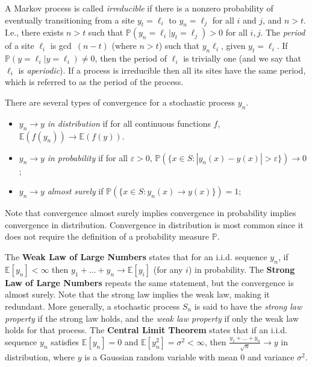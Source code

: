 \documentclass[12pt]{article}
\begin{document}
\begin{itemize}
A Markov process is called {\it irreducible} if there is a nonzero
probability of eventually transitioning from a site $y_t = \ell_i$ to
$y_n = \ell_j$ for all $i$ and $j$, and $n > t$.
I.e., there exists $n > t$ such that $\mathbb{P}(y_n=\ell_i | y_t=\ell_j)>0$
for all $i,j$.
The {\it period} of a site $\ell_i$ is gcd~$(n-t)$ (where $n>t$) such
that $y_n\ell_i$, given $y_t=\ell_i$.
If $\mathbb{P}(y=\ell_i | y=\ell_i) \neq 0$, then the period of $\ell_i$
is trivially one (and we say that $\ell_i$ is {\it aperiodic}).
If a process is irreducible then all its sites have the same period,
which is referred to as the period of the process.
\end{itemize}

There are several types of convergence for a stochastic process $y_n$.
\begin{itemize}
\item $y_n \rightarrow y$ {\it in distribution} if for all continuous
functions $f$, $\mathbb{E}(f(y_n)) \rightarrow \mathbb{E}(f(y))$.
\item $y_n \rightarrow y$ {\it in probability} if for all $\varepsilon>0$,
$\mathbb{P}(\{x\in S : |y_n(x) - y(x)|>\varepsilon\})\rightarrow 0$;
\item $y_n \rightarrow y$ {\it almost surely} if
$\mathbb{P}(\{x\in S : y_n(x) \rightarrow y(x)\}) = 1$;
\end{itemize}
Note that convergence almost surely implies convergence in probability
implies convergence in distribution.
Convergence in distribution is most common since it does not require
the definition of a probability measure $\mathbb{P}$.

The {\bf Weak Law of Large Numbers} states that for an i.i.d. sequence
$y_n$, if $\mathbb{E}[y_n]<\infty$ then 
$y_1 + \ldots + y_n \rightarrow \mathbb{E}[y_i]$ (for any $i$) in probability.
The {\bf Strong Law of Large Numbers} repeats the same statement, but
the convergence is almost surely.
Note that the strong law implies the weak law, making it redundant.
More generally, a stochastic process $S_n$ is said to have the
{\it strong law property} if the strong law holds, and the 
{\it weak law property} if only the weak law holds for that process.
The {\bf Central Limit Theorem} states that if an i.i.d. sequence
$y_n$ satisfies
$\mathbb{E}[y_n] = 0$ and $\mathbb{E}[y_n^2] = \sigma^2 < \infty$,
then $\frac{y_1 + \ldots + y_n}{\sqrt{n}} \rightarrow y$ in distribution,
where $y$ is a Gaussian random variable with mean $0$ and variance $\sigma^2$.
\end{document}
